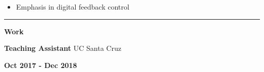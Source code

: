 \documentclass[paper=a4,fontsize=11pt]{article} %
\def \sectionSpace      {0.3cm}    %
\def \leftColSpace      {0.1}       %
\def \middleColSpace    {0.71}       %
\def \bigMiddleColSpace {0.8}       %
\def \rightColSpace     {0.25}      %
\def \lineWidth         {20.25cm}   %
\def \lineThickness     {1pt}     %
\begin{document}
    \noindent
    \begin{minipage}[t]{\leftColSpace\linewidth}
        \hfill
    \end{minipage}
    \begin{minipage}[t]{\bigMiddleColSpace\linewidth}
        \begin{itemize}[noitemsep,topsep=0pt]
            \item Emphasis in digital feedback control
        \end{itemize}
    \end{minipage}
    \vspace{-0.275cm}

    \vspace{\sectionSpace}
    \noindent\rule{\lineWidth}{\lineThickness}

    \noindent
    \begin{minipage}[t]{\leftColSpace\linewidth}
        \noindent \textbf{Work}
    \end{minipage}
    \begin{minipage}[t]{\middleColSpace\linewidth}
        \noindent \textbf{Teaching Assistant} \quad UC Santa Cruz
    \end{minipage}
    \begin{minipage}[t]{\rightColSpace\linewidth}
        \noindent \textbf{Oct 2017 - Dec 2018}
    \end{minipage}
\end{document}

